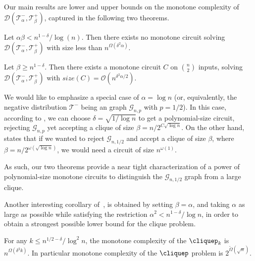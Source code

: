 Our main results are lower and upper bounds on the monotone complexity of $\mathcal{D}(\mathcal{T}^-_\alpha, \mathcal{T}^+_\beta)$, captured in the following two theorems.



\begin{theorem}
\label{thm:main-lb}
    Let $\alpha\beta < n^{1-\delta}/\log(n)$. Then there exists no monotone circuit solving $\mathcal{D}(\mathcal{T}^-_\alpha, \mathcal{T}^+_\beta)$ with size less than $n^{\Omega(\delta^2 \alpha)}$.
\end{theorem}

\begin{theorem}
\label{thm:main-ub}
    Let  $\beta \geq n^{1-\delta}$. Then there exists a monotone circuit $C$ on $\binom{n}{2}$ inputs, solving $\mathcal{D}(\mathcal{T}^-_\alpha, \mathcal{T}^+_\beta)$ with $size(C) = \mathcal{O}(n^{\delta^2\alpha/2})$.
\end{theorem}

We would like to emphasize a special case of $\alpha = \log n$ (or, equivalently, the negative distribution $\mathcal{T}^-$ being an \ErdosRenyi graph $\mathcal{G}_{n,p}$ with $p=1/2$). In this case, according to , we can choose $\delta = \sqrt{1/\log n}$ to get a polynomial-size circuit, rejecting $\mathcal{G}_{n,p}$ yet accepting a clique of size $\beta = n / 2^{C \sqrt{\log n}}$. On the other hand,  states that if we wanted to reject $\mathcal{G}_{n, 1/2}$ and accept a clique of size $\beta$, where $\beta = n / 2^{\omega(\sqrt{\log n})}$, we would need a circuit of size $n^{\omega(1)}$. 

As such, our two theorems provide a near tight characterization of a power of polynomial-size monotone circuits to distinguish the $\mathcal{G}_{n, 1/2}$ graph from a large clique. 

Another interesting corollary of~, is obtained by setting $\beta = \alpha$, and taking $\alpha$ as large as possible while satisfying the restriction $\alpha^2 < n^{1-\delta}/\log n$, in order to obtain a strongest possible lower bound for the clique problem.

\begin{corollary}
    For any $k \leq n^{1/2 - \delta} / \log^2 n$, the monotone complexity of the $\cliquep_k$ is $n^{\Omega(\delta^2 k)}$. In particular monotone complexity of the $\cliquep$ problem is $2^{\tilde{\Omega}(\sqrt{n})}$.
\end{corollary}

